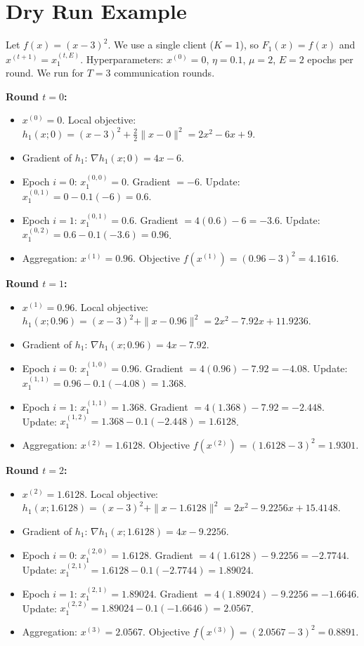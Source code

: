 \documentclass{article}
\begin{document}
\section*{Dry Run Example}
Let $f(x) = (x-3)^2$. We use a single client ($K=1$), so $F_1(x) = f(x)$ and $x^{(t+1)} = x_1^{(t, E)}$. 
Hyperparameters: $x^{(0)} = 0$, $\eta = 0.1$, $\mu = 2$, $E = 2$ epochs per round. We run for $T=3$ communication rounds.

\textbf{Round $t=0$:}
\begin{itemize}
    \item $x^{(0)} = 0$. Local objective: $h_1(x; 0) = (x-3)^2 + \frac{2}{2}\|x - 0\|^2 = 2x^2 - 6x + 9$.
    \item Gradient of $h_1$: $\nabla h_1(x; 0) = 4x - 6$.
    \item Epoch $i=0$: $x_1^{(0,0)} = 0$. Gradient $= -6$. Update: $x_1^{(0,1)} = 0 - 0.1(-6) = 0.6$.
    \item Epoch $i=1$: $x_1^{(0,1)} = 0.6$. Gradient $= 4(0.6) - 6 = -3.6$. Update: $x_1^{(0,2)} = 0.6 - 0.1(-3.6) = 0.96$.
    \item Aggregation: $x^{(1)} = 0.96$. Objective $f(x^{(1)}) = (0.96-3)^2 = 4.1616$.
\end{itemize}

\textbf{Round $t=1$:}
\begin{itemize}
    \item $x^{(1)} = 0.96$. Local objective: $h_1(x; 0.96) = (x-3)^2 + \|x - 0.96\|^2 = 2x^2 - 7.92x + 11.9236$.
    \item Gradient of $h_1$: $\nabla h_1(x; 0.96) = 4x - 7.92$.
    \item Epoch $i=0$: $x_1^{(1,0)} = 0.96$. Gradient $= 4(0.96) - 7.92 = -4.08$. Update: $x_1^{(1,1)} = 0.96 - 0.1(-4.08) = 1.368$.
    \item Epoch $i=1$: $x_1^{(1,1)} = 1.368$. Gradient $= 4(1.368) - 7.92 = -2.448$. Update: $x_1^{(1,2)} = 1.368 - 0.1(-2.448) = 1.6128$.
    \item Aggregation: $x^{(2)} = 1.6128$. Objective $f(x^{(2)}) = (1.6128-3)^2 = 1.9301$.
\end{itemize}

\textbf{Round $t=2$:}
\begin{itemize}
    \item $x^{(2)} = 1.6128$. Local objective: $h_1(x; 1.6128) = (x-3)^2 + \|x - 1.6128\|^2 = 2x^2 - 9.2256x + 15.4148$.
    \item Gradient of $h_1$: $\nabla h_1(x; 1.6128) = 4x - 9.2256$.
    \item Epoch $i=0$: $x_1^{(2,0)} = 1.6128$. Gradient $= 4(1.6128) - 9.2256 = -2.7744$. Update: $x_1^{(2,1)} = 1.6128 - 0.1(-2.7744) = 1.89024$.
    \item Epoch $i=1$: $x_1^{(2,1)} = 1.89024$. Gradient $= 4(1.89024) - 9.2256 = -1.6646$. Update: $x_1^{(2,2)} = 1.89024 - 0.1(-1.6646) = 2.0567$.
    \item Aggregation: $x^{(3)} = 2.0567$. Objective $f(x^{(3)}) = (2.0567-3)^2 = 0.8891$.
\end{itemize}
\end{document}
